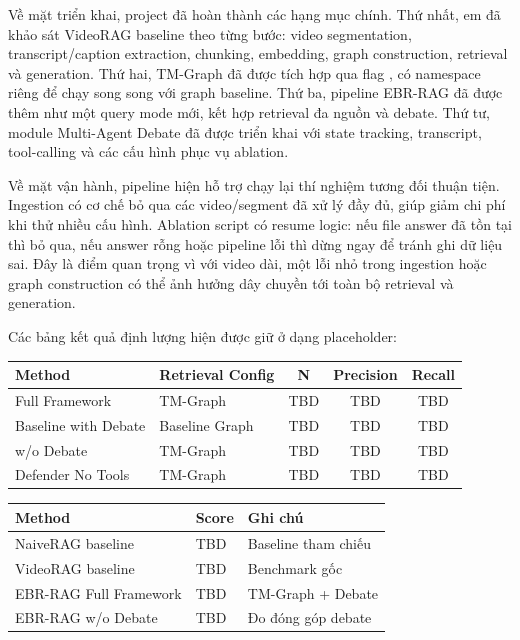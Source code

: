 \documentclass[12pt,a4paper]{article}
\newcommand{\codepath}[1]{\path{#1}}
\begin{document}
Về mặt triển khai, project đã hoàn thành các hạng mục chính. Thứ nhất, em đã khảo sát VideoRAG baseline theo từng bước: video segmentation, transcript/caption extraction, chunking, embedding, graph construction, retrieval và generation. Thứ hai, TM-Graph đã được tích hợp qua flag \codepath{use_tm_graph}, có namespace riêng để chạy song song với graph baseline. Thứ ba, pipeline EBR-RAG đã được thêm như một query mode mới, kết hợp retrieval đa nguồn và debate. Thứ tư, module Multi-Agent Debate đã được triển khai với state tracking, transcript, tool-calling và các cấu hình phục vụ ablation.

Về mặt vận hành, pipeline hiện hỗ trợ chạy lại thí nghiệm tương đối thuận tiện. Ingestion có cơ chế bỏ qua các video/segment đã xử lý đầy đủ, giúp giảm chi phí khi thử nhiều cấu hình. Ablation script có resume logic: nếu file answer đã tồn tại thì bỏ qua, nếu answer rỗng hoặc pipeline lỗi thì dừng ngay để tránh ghi dữ liệu sai. Đây là điểm quan trọng vì với video dài, một lỗi nhỏ trong ingestion hoặc graph construction có thể ảnh hưởng dây chuyền tới toàn bộ retrieval và generation.

Các bảng kết quả định lượng hiện được giữ ở dạng placeholder:

\begin{center}
\small
\begin{tabular}{p{}p{}ccc}
\toprule
\textbf{Method} & \textbf{Retrieval Config} & \textbf{N} & \textbf{Precision} & \textbf{Recall} \\
\midrule
Full Framework & TM-Graph & TBD & TBD & TBD \\
Baseline with Debate & Baseline Graph & TBD & TBD & TBD \\
w/o Debate & TM-Graph & TBD & TBD & TBD \\
Defender No Tools & TM-Graph & TBD & TBD & TBD \\
\bottomrule
\end{tabular}
\end{center}

\begin{center}
\small
\begin{tabular}{p{}p{}p{}}
\toprule
\textbf{Method} & \textbf{Score} & \textbf{Ghi chú} \\
\midrule
NaiveRAG baseline & TBD & Baseline tham chiếu \\
VideoRAG baseline & TBD & Benchmark gốc \\
EBR-RAG Full Framework & TBD & TM-Graph + Debate \\
EBR-RAG w/o Debate & TBD & Đo đóng góp debate \\
\bottomrule
\end{tabular}
\end{center}
\end{document}
